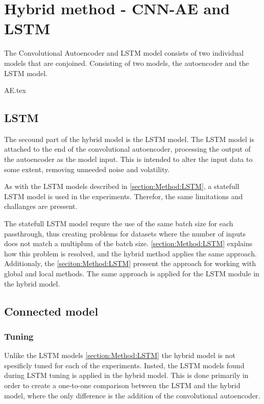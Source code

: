 
\section{Hybrid method - CNN-AE and LSTM}
\label{section:Method:CNN-AE-LSTM}


The Convolutional Autoencoder and LSTM model consists of two individual models that are conjoined.
Consisting of two models,
the autoencoder and the LSTM model.


{AE.tex}


\subsection{LSTM}

The secound part of the hybrid model is the LSTM model.
The LSTM model is attached to the end of the convolutional autoencoder,
processing the output of the autoencoder as the model input.
This is intended to alter the input data to some extent, removing unneeded noise and volatility.

As with the LSTM models described in \cref{section:Method:LSTM}, a statefull LSTM model is used in the experiments.
Therefor, the same limitations and challanges are pressent.

The statefull LSTM model requre the use of the same batch size for each passthrough, thus creating problems for datasets where the number
of inputs does not match a multiplum of the batch size.
\cref{section:Method:LSTM} explains how this problem is resolved, and the hybrid method applies the same approach.
Additionaly,
the \cref{seciton:Method:LSTM} pressent the approach for working with global and local methods.
The same approach is applied for the LSTM module in the hybrid model.


\subsection{Connected model}

\subsubsection{Tuning}
Unlike the LSTM models \cref{section:Method:LSTM} the hybrid model is not spesificly tuned for each of the experiments.
Insted, the LSTM models found during LSTM tuning is applied in the hybrid model.
This is done primarily in order to create a one-to-one comparison between the LSTM and the hybrid model,
where the only difference is the addition of the convolutional autoencoder.

